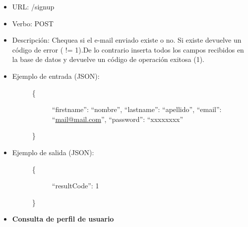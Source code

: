 \documentclass[letterpaper,10pt,english]{sphinxmanual}
\begin{document}
\begin{itemize}
\item {} 
URL: /signup

\item {} 
Verbo: POST

\item {} 
Descripción: Chequea si el e-mail enviado existe o no. Si existe devuelve un código de error ( != 1).De lo contrario inserta todos los campos recibidos en la base de datos y devuelve un código de operación exitosa (1).

\item {} \begin{description}
\item[{Ejemplo de entrada (JSON):}] \leavevmode\begin{description}
\item[{\{}] \leavevmode
``firstname'': ``nombre'',
``lastname'': ``apellido'',
``email'': ``\href{mailto:mail@mail.com}{mail@mail.com}'',
``password'': ``xxxxxxxx''

\end{description}

\}

\end{description}

\item {} \begin{description}
\item[{Ejemplo de salida (JSON):}] \leavevmode\begin{description}
\item[{\{}] \leavevmode
``resultCode'': 1

\end{description}

\}

\end{description}

\end{itemize}
\begin{itemize}
\item {} 
\textbf{Consulta de perfil de usuario}

\end{itemize}
\end{document}
